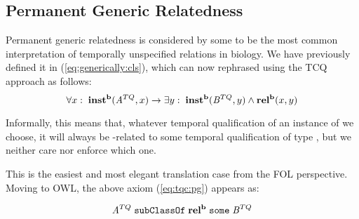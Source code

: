 
\subsection*{Permanent Generic Relatedness}
Permanent generic relatedness is considered by some to be the most common
interpretation of temporally unspecified relations in biology. We have
previously defined it in (\ref{eq:generically:cls}), which can
now rephrased using the TCQ approach as follows:
\begin{equation}
\forall x:\; \mathrm{\mathbf{inst^b}}(\mathit{A}^{TQ},x) \rightarrow \exists y :\;
\mathrm{\mathbf{inst^b}}(\mathit{B}^{TQ}, y) \wedge \mathrm{\mathbf{rel^b}}(x,y)
\label{eq:tqc:pg}
\end{equation}

Informally, this means that, whatever temporal qualification of an instance of
 we choose, it will always be -related to some temporal
qualification of type , but we neither care nor enforce which one.

This is the easiest and most elegant translation case from the FOL perspective.
Moving to OWL, the above axiom (\ref{eq:tqc:pg}) appears as:

\begin{equation}
\mathit{A}^{TQ}\;\mathtt{subClassOf}\;\mathrm{\mathbf{rel^b}}\;\mathtt{some}\;\mathit{B}^{TQ}
\label{eq:tqc:pg:owl}
\end{equation}



